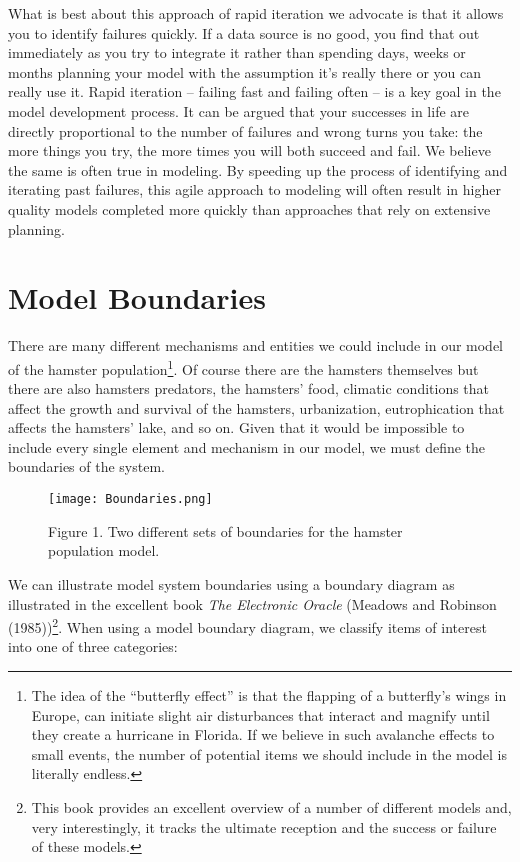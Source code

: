 \documentclass[]{memoir}
\let\Oldincludegraphics\includegraphics
\renewcommand{\includegraphics}[1]{\Oldincludegraphics[max size={\textwidth}{\textheight}]{#1}}
\begin{document}
What is best about this approach of rapid iteration we advocate is that
it allows you to identify failures quickly. If a data source is no good,
you find that out immediately as you try to integrate it rather than
spending days, weeks or months planning your model with the assumption
it's really there or you can really use it. Rapid iteration -- failing
fast and failing often -- is a key goal in the model development
process. It can be argued that your successes in life are directly
proportional to the number of failures and wrong turns you take: the
more things you try, the more times you will both succeed and fail. We
believe the same is often true in modeling. By speeding up the process
of identifying and iterating past failures, this agile approach to
modeling will often result in higher quality models completed more
quickly than approaches that rely on extensive planning.

\section{Model Boundaries}

There are many different mechanisms and entities we could include in our
model of the hamster population\footnote{The idea of the ``butterfly
  effect'' is that the flapping of a butterfly's wings in Europe, can
  initiate slight air disturbances that interact and magnify until they
  create a hurricane in Florida. If we believe in such avalanche effects
  to small events, the number of potential items we should include in
  the model is literally endless.}. Of course there are the hamsters
themselves but there are also hamsters predators, the hamsters' food,
climatic conditions that affect the growth and survival of the hamsters,
urbanization, eutrophication that affects the hamsters' lake, and so on.
Given that it would be impossible to include every single element and
mechanism in our model, we must define the boundaries of the system.

\begin{figure}[htbp]
\centering
\texttt{[image: Boundaries.png]}
\caption{Figure 1. Two different sets of boundaries for the hamster
population model.}
\end{figure}

We can illustrate model system boundaries using a boundary diagram as
illustrated in the excellent book \emph{The Electronic Oracle} (Meadows
and Robinson (1985))\footnote{This book provides an excellent overview
  of a number of different models and, very interestingly, it tracks the
  ultimate reception and the success or failure of these models.}. When
using a model boundary diagram, we classify items of interest into one
of three categories:
\end{document}

